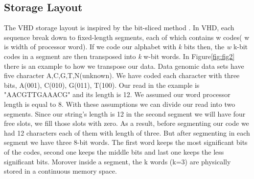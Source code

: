  \subsection{Storage Layout}
The VHD storage layout is inspired by the bit-sliced method \cite{O_Neil_1997}. In VHD, each sequence break down to fixed-length segments, each of which contains w codes( w is width of processor word). If we code our alphabet with \emph{k} bits then, the \emph{w} k-bit codes in a segment are then transposed into \emph{k} w-bit words. In Figure\ref{fig:fig2} there is an example to how we transpose our data. Data genomic data sets have five character A,C,G,T,N(unknown). We have coded each character with three bits, A(001), C(010), G(011), T(100). Our read in the example is "AACGTTGAAACG" and its length is 12. We assumed our word processor length is equal to 8. With these assumptions we can divide our read into two segments. Since our string's length is 12 in the second segment we will have four free slots, we fill those slots with zero. As a result, before segmenting our code we had 12 characters each of them with length of three. But after segmenting in each segment we have three 8-bit words. The first word keeps the most significant bits of the codes, second one keeps the middle bits and last one keeps the less significant bits. Morover inside a segment, the k words (k=3) are physically stored in a continuous memory space.
 
  
  
  
  
  
  
  
  
  